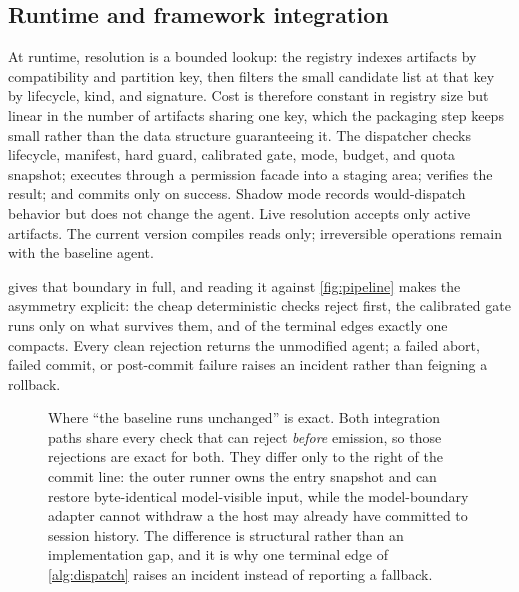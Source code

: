\subsection{Runtime and framework integration}

At runtime, resolution is a bounded lookup: the registry indexes artifacts by
compatibility and partition key, then filters the small candidate list at that key by
lifecycle, kind, and signature.  Cost is therefore constant in registry size but linear in
the number of artifacts sharing one key, which the packaging step keeps small rather than
the data structure guaranteeing it.  The
dispatcher checks lifecycle, manifest, hard guard, calibrated gate, mode, budget, and
quota snapshot; executes through a permission facade into a staging area; verifies the
result; and commits only on success.  Shadow mode records would-dispatch behavior but
does not change the agent.  Live resolution accepts only active artifacts.  The current
version compiles reads only; irreversible operations remain with the baseline agent.

 gives that boundary in full, and reading it against \cref{fig:pipeline}
makes the asymmetry explicit: the cheap deterministic checks reject first, the calibrated
gate runs only on what survives them, and of the terminal edges exactly one compacts. Every
clean rejection returns the unmodified agent; a failed abort, failed commit, or post-commit
failure raises an incident rather than feigning a rollback.



\begin{figure}[t]
  \centering
  
  \caption{Where ``the baseline runs unchanged'' is exact.  Both integration paths share
  every check that can reject \emph{before} emission, so those rejections are exact for
  both.  They differ only to the right of the commit line: the outer runner owns the
  entry snapshot and can restore byte-identical model-visible input, while the
  model-boundary adapter cannot withdraw a  the host may already have
  committed to session history.  The difference is structural rather than an
  implementation gap, and it is why one terminal edge of \cref{alg:dispatch} raises an
  incident instead of reporting a fallback.}
  \label{fig:commit-boundary}
\end{figure}

